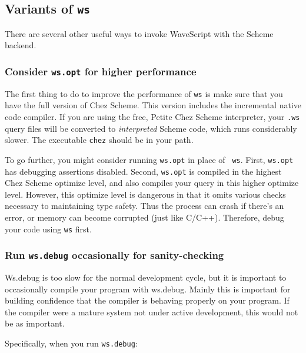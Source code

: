 \documentclass[twocolumn]{report}
\begin{document}

\subsection*{Variants of {\tt \bf ws}}

There are several other useful ways to invoke WaveScript with the
Scheme backend.

\subsubsection*{Consider {\tt \bf ws.opt} for higher performance}

The first thing to do to improve the performance of {\tt ws} is make
sure that you have the full version of Chez Scheme.  This version
includes the incremental native code compiler.  If you are using the
free, Petite Chez Scheme interpreter, your {\tt .ws} query files will
be converted to {\em interpreted} Scheme code, which runs considerably
slower.  The executable {\tt chez} should be in your path.

To go further, you might consider running {\tt ws.opt} in place of {\tt
ws}.  First, {\tt ws.opt} has debugging assertions disabled. 
Second, {\tt ws.opt} is compiled in the highest Chez Scheme optimize
level, and also compiles your query in this higher optimize level.
However, this optimize level is dangerous in that it omits various
checks necessary to maintaining type safety.  Thus the process can
crash if there's an error, or memory can become corrupted (just like
C/C++).  Therefore, debug your code using {\tt ws} first.

\subsubsection*{Run {\tt \bf ws.debug} occasionally for sanity-checking}

Ws.debug is too slow for the normal development cycle, but it is
important to occasionally compile your program with ws.debug.  Mainly
this is important for building confidence that the compiler is
behaving properly on your program.  If the
compiler were a mature system not under active development, this would
not be as important.  


Specifically, when you run {\tt ws.debug}:
\end{document}
